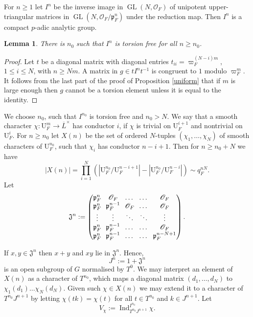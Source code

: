 \documentclass[11pt]{article}
\let\mathcal\mathscr
\newtheorem{lem}[prop]{Lemma}
\theoremstyle{definition}
\DeclareMathOperator{\Ind}{Ind}
\DeclareMathOperator{\GL}{GL}
\newcommand{\Indu}[3]{\Ind_{#1}^{#2}{#3}}
\newcommand{\cO}{\mathcal{O}}
\newcommand{\pp}{\mathfrak p}
\newcommand{\pF}{\mathfrak{p}_F}
\newcommand{\UU}{\mathrm U}
\newcommand{\Lbar}{\overline{L}}
\begin{document}
For $n\ge 1$ let $I^n$ be the inverse image in $\GL(N, \cO_F)$ of unipotent upper-triangular matrices
in $\GL(N, \cO_{F}/\pp_F^n)$ under the reduction map. Then $I^n$ is a compact $p$-adic analytic group.

\begin{lem} There is $n_0$ such that $I^n$ is torsion free for all $n\ge n_0$.
\end{lem}

\begin{proof} Let $t$ be a diagonal matrix with diagonal entries $t_{ii}= \varpi_F^{(N-i) m}$, $1\le i\le N$, with $n\ge Nm $.
A matrix in $g\in t I^n t^{-1}$ is congruent to $1$ modulo $\varpi_F^m$. It follows from the last part
of the proof of Proposition \ref{uniform} that if $m$ is large enough then
$g$ cannot be a torsion element unless it is equal to the identity.
\end{proof}

We choose $n_0$, such that $I^{n_0}$ is torsion free and $n_0> N$. We say that a smooth character $\chi: \UU^{m}_F\to \Lbar^{\times}$ has conductor $i$, if $\chi$ is trivial on $\UU^{i+1}_F$ and nontrivial on $\UU^i_F$.
For $n\ge n_0$ let $X(n)$ be the set of ordered $N$-tuples $(\chi_1, \ldots, \chi_N)$ of smooth characters of $\UU^{n_0}_F$, such that $\chi_i$ has conductor $n-i+1$. Then for $n\ge n_0 +N$ we have
\begin{equation} \label{size_X_n}
|X(n)|= \prod_{i=1}^N (|\UU^{n_0}_F/\UU^{n-i+1}_F| -|\UU^{n_0}_F/\UU^{n-i}_F|)\sim q_F^{nN}.
\end{equation}
Let
\[\arraycolsep3.5pt
\mathfrak J^n:=\begin{pmatrix}\pF^n & \cO_F & \ldots & \ldots& \cO_F\\
\pF^n & \pF^{n-1}&\cO_F& \ldots & \cO_F\\
\vdots & \vdots &\ddots & \ddots & \vdots\\
\pF^n & \pF^{n-1} & \ldots &\dots & \cO_F \\
\pF^n & \pF^{n-1} & \ldots &\dots & \pF^{n-N+1}\end{pmatrix}.
\]

If $x, y\in \mathfrak J^n$ then $x+y$ and $xy$ lie in $\mathfrak J^n$. Hence,
\[
J^n:= 1 +\mathfrak J^n
\]
is an open subgroup of $G$ normalised by $T^0$. We may interpret an element of $X(n)$ as a character of $T^{n_0}$, which maps a
diagonal matrix $(d_1, \ldots, d_N)$ to $\chi_1(d_1)\ldots \chi_N(d_N)$. Given such $\chi\in X(n)$ we may extend it to a character of $T^{n_0} J^{n+1}$ by letting $\chi(tk)=\chi(t)$ for all $t\in T^{n_0}$
and $k\in J^{n+1}$. Let
\[
V_{\chi}:= \Indu{T^{n_0} J^{n+1}}{I^{n_0}}{\chi}.
\]
\end{document}
